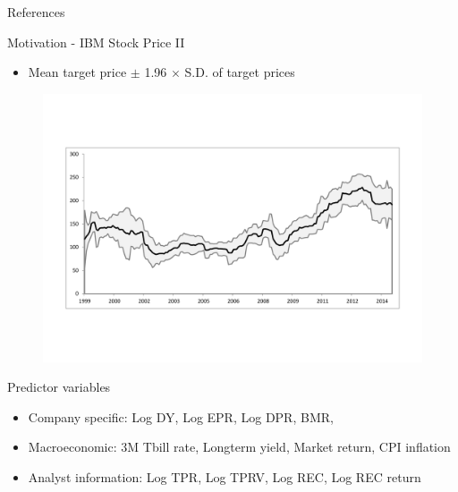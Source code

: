 \documentclass[9pt,xcolor=x11names,compress]{beamer}
\theoremstyle{standard}
\theoremstyle{notes}
\begin{document}
\appendix
{}
\setcounter{finalframe}{\value{framenumber}}


\begin{frame}[plain]{References}
\fontsize{5}{5}\selectfont{
	\setlength{\bibsep}{0\baselineskip}
	
	}
\end{frame}

\begin{frame}[plain]{Motivation - IBM Stock Price II}
\begin{itemize}
	\item Mean target price $\pm$ 1.96 $\times$ S.D. of target prices 
\end{itemize}

\begin{figure}
	\centering
	\includegraphics[width=1\linewidth]{../../Tex/plots/ibm_SD}
	\label{fig:ibmpriceplot}
\end{figure}

\end{frame}

\begin{frame}[plain]{Predictor variables}
\begin{itemize}\setlength\itemsep{1em}
	\item Company specific: Log DY, Log EPR, Log DPR, BMR, 
	\item Macroeconomic: 3M Tbill rate, Longterm yield, Market return, CPI inflation
	\item Analyst information: Log TPR, Log TPRV, Log REC, Log REC return
\end{itemize}
\end{frame}

\setcounter{framenumber}{\value{finalframe}}
\end{document}
